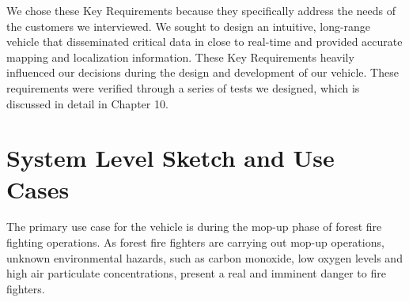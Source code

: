 We chose these Key Requirements because they specifically address the needs of the customers we interviewed. We sought to design an intuitive,  long-range vehicle that disseminated critical data in close to real-time and provided accurate mapping and localization information. These Key Requirements heavily influenced our decisions during the design and development of our vehicle. These requirements were verified through a series of tests we designed, which is discussed in detail in Chapter 10. 
%
\section{System Level Sketch and Use Cases}
The primary use case for the vehicle is during the mop-up phase of forest fire fighting operations. As forest fire fighters are carrying out mop-up operations, unknown environmental hazards, such as carbon monoxide, low oxygen levels and high air particulate concentrations,  present a real and imminent danger to fire fighters. 

